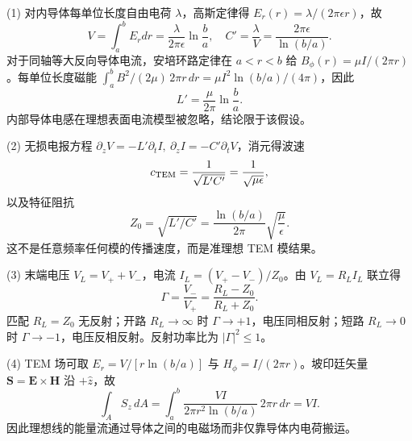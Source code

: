 (1) 对内导体每单位长度自由电荷 \(\lambda\)，高斯定律得 \(E_r(r)=\lambda/(2\pi\epsilon r)\)，故
\[
V=\int_a^b E_rdr=\frac{\lambda}{2\pi\epsilon}\ln\frac ba,\quad
C'=\frac\lambda V=\frac{2\pi\epsilon}{\ln(b/a)}.
\]
对于同轴等大反向导体电流，安培环路定律在 \(a<r<b\) 给 \(B_\phi(r)=\mu I/(2\pi r)\)。每单位长度磁能 \(\int_a^bB^2/(2\mu)\,2\pi r\,dr=\mu I^2\ln(b/a)/(4\pi)\)，因此
\[
L'=\frac\mu{2\pi}\ln\frac ba.
\]
内部导体电感在理想表面电流模型被忽略，结论限于该假设。

(2) 无损电报方程 \(\partial_zV=-L'\partial_tI,\ \partial_zI=-C'\partial_tV\)，消元得波速
\[
c_{\rm TEM}=\frac1{\sqrt{L'C'}}=\frac1{\sqrt{\mu\epsilon}},
\]
以及特征阻抗
\[
Z_0=\sqrt{L'/C'}=\frac{\ln(b/a)}{2\pi}\sqrt{\frac\mu\epsilon}.
\]
这不是任意频率任何模的传播速度，而是准理想 TEM 模结果。

(3) 末端电压 \(V_L=V_++V_-\)，电流 \(I_L=(V_+-V_-)/Z_0\)。由 \(V_L=R_LI_L\) 联立得
\[
\Gamma=\frac{V_-}{V_+}=\frac{R_L-Z_0}{R_L+Z_0}.
\]
匹配 \(R_L=Z_0\) 无反射；开路 \(R_L\to\infty\) 时 \(\Gamma\to+1\)，电压同相反射；短路 \(R_L\to0\) 时 \(\Gamma\to-1\)，电压反相反射。反射功率比为 \(|\Gamma|^2\le1\)。

(4) TEM 场可取 \(E_r=V/[r\ln(b/a)]\) 与 \(H_\phi=I/(2\pi r)\)。坡印廷矢量 \(\boldsymbol S=\boldsymbol E\times\boldsymbol H\) 沿 \(+\hat z\)，故
\[
\int_A S_z\,dA=\int_a^b\frac{VI}{2\pi r^2\ln(b/a)}\,2\pi r\,dr=VI.
\]
因此理想线的能量流通过导体之间的电磁场而非仅靠导体内电荷搬运。
